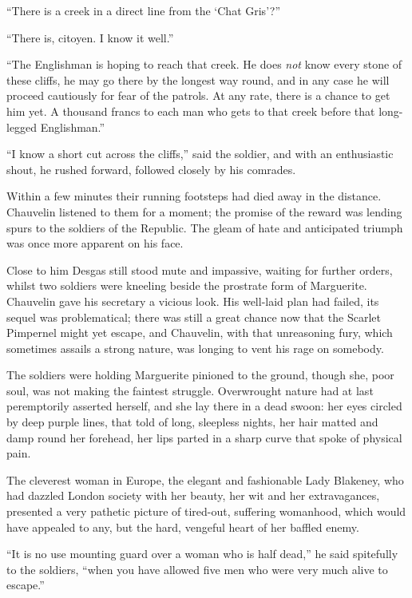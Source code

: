 \documentclass[paper=5.5in:8.5in,BCOR=7mm,twoside,DIV=calc,12pt,usegeometry,chapterprefix,endperiod,headings=big]{scrbook}
\begin{document}
\enquote{There is a creek in a direct line from the \enquote{Chat Gris}?}

\enquote{There is, citoyen. I know it well.}

\enquote{The Englishman is hoping to reach that creek. He does \textit{not} know every stone of these cliffs, he may go there by the longest way round, and in any case he will proceed cautiously for fear of the patrols. At any rate, there is a chance to get him yet. A thousand francs to each man who gets to that creek before that long-legged Englishman.}

\enquote{I know a short cut across the cliffs,} said the soldier, and with an enthusiastic shout, he rushed forward, followed closely by his comrades.

Within a few minutes their running footsteps had died away in the distance. Chauvelin listened to them for a moment; the promise of the reward was lending spurs to the soldiers of the Republic. The gleam of hate and anticipated triumph was once more apparent on his face.

Close to him Desgas still stood mute and impassive, waiting for further orders, whilst two soldiers were kneeling beside the prostrate form of Marguerite. Chauvelin gave his secretary a vicious look. His well-laid plan had failed, its sequel was problematical; there was still a great chance now that the Scarlet Pimpernel might yet escape, and Chauvelin, with that unreasoning fury, which sometimes assails a strong nature, was longing to vent his rage on somebody.

The soldiers were holding Marguerite pinioned to the ground, though she, poor soul, was not making the faintest struggle. Overwrought nature had at last peremptorily asserted herself, and she lay there in a dead swoon: her eyes circled by deep purple lines, that told of long, sleepless nights, her hair matted and damp round her forehead, her lips parted in a sharp curve that spoke of physical pain.

The cleverest woman in Europe, the elegant and fashionable Lady Blakeney, who had dazzled London society with her beauty, her wit and her extravagances, presented a very pathetic picture of tired-out, suffering womanhood, which would have appealed to any, but the hard, vengeful heart of her baffled enemy.

\enquote{It is no use mounting guard over a woman who is half dead,} he said spitefully to the soldiers, \enquote{when you have allowed five men who were very much alive to escape.}
\end{document}
